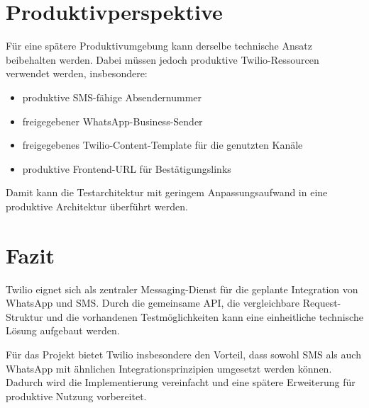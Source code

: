 \documentclass[12pt,a4paper]{article}
\begin{document}
\section{Produktivperspektive}

Für eine spätere Produktivumgebung kann derselbe technische Ansatz
beibehalten werden. Dabei müssen jedoch produktive Twilio-Ressourcen
verwendet werden, insbesondere:

\begin{itemize}
    \item produktive SMS-fähige Absendernummer
    \item freigegebener WhatsApp-Business-Sender
    \item freigegebenes Twilio-Content-Template für die genutzten Kanäle
    \item produktive Frontend-URL für Bestätigungslinks
\end{itemize}

Damit kann die Testarchitektur mit geringem Anpassungsaufwand in eine
produktive Architektur überführt werden.

\section{Fazit}

Twilio eignet sich als zentraler Messaging-Dienst für die geplante
Integration von WhatsApp und SMS. Durch die gemeinsame API, die
vergleichbare Request-Struktur und die vorhandenen Testmöglichkeiten
kann eine einheitliche technische Lösung aufgebaut werden.

Für das Projekt bietet Twilio insbesondere den Vorteil, dass sowohl
SMS als auch WhatsApp mit ähnlichen Integrationsprinzipien umgesetzt
werden können. Dadurch wird die Implementierung vereinfacht und eine
spätere Erweiterung für produktive Nutzung vorbereitet.
\end{document}
